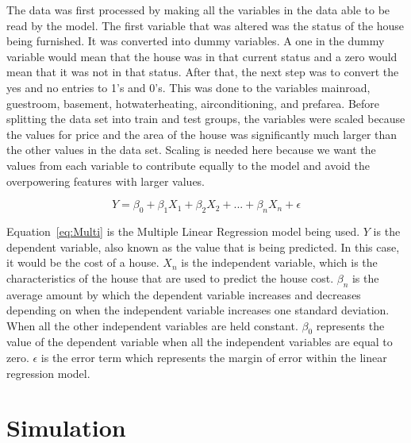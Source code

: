 \documentclass[12pt]{article}
\begin{document}
The data was first processed by making all the variables in the data able to be read by the model. The first variable that was altered was the status of the house being furnished. It was converted into dummy variables. A one in the dummy variable would mean that the house was in that current status and a zero would mean that it was not in that status. After that, the next step was to convert the yes and no entries to 1's and 0's. This was done to the variables mainroad, guestroom, basement, hotwaterheating, airconditioning, and prefarea. Before splitting the data set into train and test groups, the variables were scaled because the values for price and the area of the house was significantly much larger than the other values in the data set. Scaling is needed here because we want the values from each variable to contribute equally to the model and avoid the overpowering features with larger values. 




\begin{equation}
  \label{eq:Multi}
  Y = \beta_{0} + \beta_{1}X_{1} + \beta_{2}X_{2} + ... + \beta_{n}X_{n} + \epsilon
\end{equation}

Equation~\ref{eq:Multi} is the Multiple Linear Regression model being used. \(Y\) is the dependent variable, also known as the value that is being predicted. In this case, it would be the cost of a house. \(X_{n}\) is the independent variable, which is the characteristics of the house that are used to predict the house cost. \(\beta_{n}\) is the average amount by which the dependent variable increases and decreases depending on when the independent variable increases one standard deviation. When all the other independent variables are held constant. \(\beta_{0}\) represents the value of the dependent variable when all the independent variables are equal to zero. \(\epsilon\) is the error term which represents the margin of error within the linear regression model. \cite{uyanik2013}


\section{Simulation}
\label{sec:sim}
\end{document}
